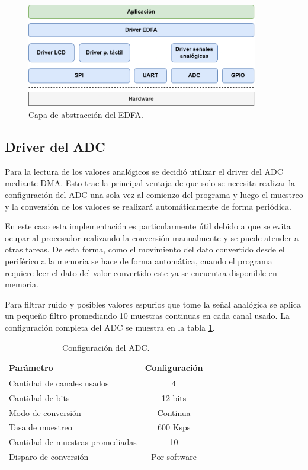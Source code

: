 \begin{figure}[H]
\centering
\includegraphics[width=0.9\textwidth]{./Figures/halamp2.png}
\caption{Capa de abstracción del EDFA.}
\label{fig:halAmp}
\end{figure}

\subsection{Driver del ADC}

Para la lectura de los valores analógicos se decidió utilizar el driver del ADC mediante DMA. Esto trae la principal ventaja de que solo se necesita realizar la configuración del ADC una sola vez al comienzo del programa y luego el muestreo y la conversión de los valores se realizará automáticamente de forma periódica.

En este caso esta implementación es particularmente útil debido a que se evita ocupar al procesador realizando la conversión manualmente y se puede atender a otras tareas. De esta forma, como el movimiento del dato convertido desde el periférico a la memoria se hace de forma automática, cuando el programa requiere leer el dato del valor convertido este ya se encuentra disponible en memoria.

Para filtrar ruido y posibles valores espurios que tome la señal analógica se aplica un pequeño filtro promediando 10 muestras continuas en cada canal usado. La configuración completa del ADC se muestra en la tabla \ref{tab:configADC}.

\begin{table}[H]
	\centering
	\caption{Configuración del ADC.}
	\begin{tabular}{l c}
		\toprule
		\textbf{Parámetro} & \textbf{Configuración}  \\
		\midrule
		Cantidad de canales usados & 4		\\
		Cantidad de bits		& 12 bits 	 		 \\
		Modo de conversión		& Continua   \\
		Tasa de muestreo		& 600 Ksps	 \\
		Cantidad de muestras promediadas	& 10 \\
		Disparo de conversión	& Por software \\
		\bottomrule
		\hline
	\end{tabular}
	\label{tab:configADC}
\end{table}

